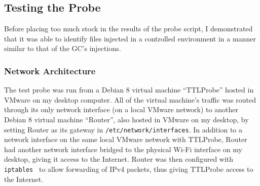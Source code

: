 \subsection{Testing the Probe}
Before placing too much stock in the results of the probe script, I demonstrated that it was able to identify files injected in a controlled environment in a manner similar to that of the GC's injections.
\subsubsection{Network Architecture}
The test probe was run from a Debian 8 virtual machine ``TTLProbe'' hosted in VMware on my desktop computer.
All of the virtual machine's traffic was routed through its only network interface (on a local VMware network) to another Debian 8 virtual machine ``Router'', also hosted in VMware on my desktop, by setting Router as its gateway in \texttt{/etc/network/interfaces}.
In addition to a network interface on the same local VMware network with TTLProbe, Router had another network interface bridged to the physical Wi-Fi interface on my desktop, giving it access to the Internet.
Router was then configured with \texttt{iptables}~\cite{Russell2000} to allow forwarding of IPv4 packets, thus giving TTLProbe access to the Internet.
